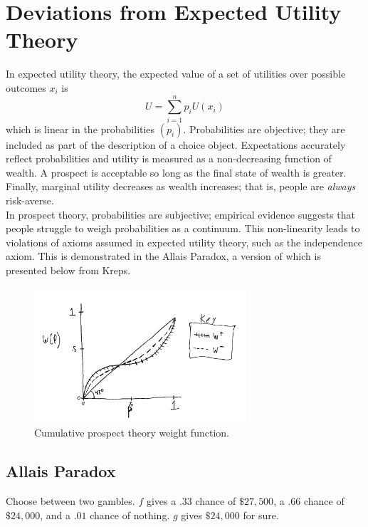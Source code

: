 \documentclass[a4paper,12pt]{article}
\numberwithin{equation}{section}
\theoremstyle{definition}
\begin{document}
\section{Deviations from Expected Utility Theory}

In expected utility theory, the expected value of a set of utilities over possible outcomes $x_i$ is 
\begin{equation*}
{U} = \sum_{i=1}^np_iU(x_i)
\end{equation*} which is linear in the probabilities $(p_i)$.
Probabilities are objective; they are included as part of the description of a choice object. Expectations accurately reflect probabilities and utility is measured as a non-decreasing function of wealth. A prospect is acceptable so long as the final state of wealth is greater. Finally, marginal utility decreases as wealth increases; that is, people are \textit{always} risk-averse.
\\

In prospect theory, probabilities are subjective; empirical evidence suggests that people struggle to weigh probabilities as a continuum. This non-linearity leads to violations of axioms assumed in expected utility theory, such as the independence axiom. This is demonstrated in the Allais Paradox, a version of which is presented below from Kreps.

\begin{figure}
\centering
\includegraphics[width=0.7\textwidth]{weightingfunction.pdf}
\caption{\label{fig:weightfunction} Cumulative prospect theory weight function. }
\end{figure}

\subsection{Allais Paradox}
Choose between two gambles. $f$ gives a $.33$ chance of $\$27,500$, a $.66$ chance of $\$24,000$, and a $.01$ chance of nothing. $g$ gives $\$24,000$ for sure.
\\
\end{document}
